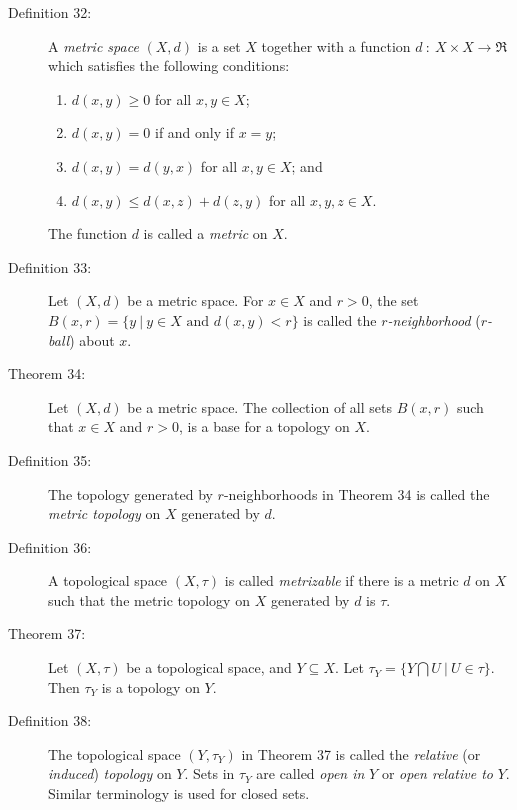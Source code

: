 \documentclass{article}
\begin{document}
\begin{description}
  \item[Definition 32:] A \emph{metric space} $(X,d)$ is a set $X$ together with a function $d  \ : \ X \times X  \rightarrow \Re$ which satisfies the following conditions:
    \begin{enumerate}[\hspace{1cm}1.]
      \item $d(x,y) \geq 0$ for all $x,y \in X$;
      \item $d(x,y) = 0$ if and only if $x=y$;
      \item $d(x,y) = d(y,x)$ for all $x,y \in X$; and
      \item $d(x,y) \leq d(x,z)+d(z,y)$ for all $x,y,z \in X$.
    \end{enumerate}
    The function $d$ is called a \emph{metric} on $X$.

  \item[Definition 33:] Let $(X,d)$ be a metric space. For $x \in X$ and $r>0$, the set $B(x,r) = \{ y \ \vert \ y \in X \text{ and } d(x,y)<r \}$ is called the \emph{$r$-neighborhood} (\emph{$r$-ball}) about $x$.

  \item[Theorem 34:] Let $(X,d)$ be a metric space. The collection of all sets $B(x,r)$ such that $x \in X$ and $r>0$, is a base for a topology on $X$.

  \item[Definition 35:] The topology generated by $r$-neighborhoods in Theorem 34 is called the \emph{metric topology} on $X$ generated by $d$.

  \item[Definition 36:] A topological space $(X,\tau)$ is called \emph{metrizable} if there is a metric $d$ on $X$ such that the metric topology on $X$ generated by $d$ is $\tau$.

  \item[Theorem 37:] Let $(X,\tau)$ be a topological space, and $Y \subseteq X$. Let $\tau_{Y} = \{ Y \bigcap U \ \vert \ U \in \tau \}$. Then $\tau_{Y}$ is a topology on $Y$.

  \item[Definition 38:] The topological space $(Y, \tau_{Y})$ in Theorem 37 is called the \emph{relative} (or \emph{induced}) \emph{topology} on $Y$. Sets in $\tau_{Y}$ are called \emph{open in} $Y$ or \emph{open relative to} $Y$. Similar terminology is used for closed sets.


\end{description}
\end{document}
